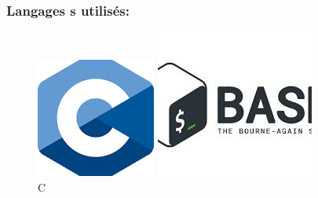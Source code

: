 \subsubsection*{Langages s utilisés:}
\begin{figure}[hbt!]
  \centering
  \begin{minipage}[b]{0.18\textwidth}
    \includegraphics[width=\textwidth]{images_pfe/c.png}
    \caption{C}
  \end{minipage}\hfill
  \begin{minipage}[b]{0.18\textwidth}
    \includegraphics[width=\textwidth]{images_pfe/bash.jpeg}

\end{minipage}
\end{figure}
